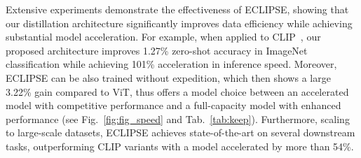 Extensive experiments demonstrate the effectiveness of ECLIPSE, showing that our distillation architecture significantly improves data efficiency while achieving substantial model acceleration.
For example, when applied to CLIP~\cite{radford2021learning}, our proposed architecture improves 1.27\% zero-shot accuracy in ImageNet classification while achieving 101\% acceleration in inference speed.
Moreover, ECLIPSE can be also trained without expedition, which then shows a large 3.22\% gain compared to ViT, thus offers a model choice between an accelerated model with competitive performance and a full-capacity model with enhanced performance (see Fig.~\ref{fig:fig_speed} and Tab.~\ref{tab:keep}).
Furthermore, scaling to large-scale datasets, ECLIPSE achieves state-of-the-art on several downstream tasks, outperforming CLIP variants with a model accelerated by more than 54\%.

